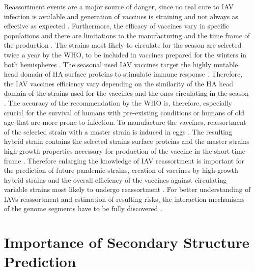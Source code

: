 Reassortment events are a major source of danger, since no real cure to \gls{IAV} infection is available and generation of vaccines is straining and not always as effective as expected \autocite{wahlgren_influenza_2011, wong_traditional_2013}. Furthermore, the efficacy of vaccines vary in specific populations and there are limitations to the manufacturing and the time frame of the production \autocite{wong_traditional_2013}. The strains most likely to circulate for the season are selected twice a year by the \gls{WHO}, to be included in vaccines prepared for the winters in both hemispheres \autocite{barr_epidemiological_2010}. The seasonal used \gls{IAV} vaccines target the highly mutable head domain of \gls{HA} surface proteins to stimulate immune response \autocite{wong_traditional_2013, wei_next-generation_2020}. Therefore, the \gls{IAV} vaccines efficiency vary depending on the similarity of the \gls{HA} head domain of the strains used for the vaccines and the ones circulating in the season \autocite{wei_next-generation_2020}. The accuracy of the recommendation by the \gls{WHO} is, therefore, especially crucial for the survival of humans with pre-existing conditions or humans of old age that are more prone to infection. To manufacture the vaccines, reassortment of the selected strain with a master strain is induced in eggs \autocite{wong_traditional_2013}. The resulting hybrid strain contains the selected strains surface proteins and the master strains high-growth properties necessary for production of the vaccine in the short time frame \autocite{wong_traditional_2013}. Therefore enlarging the knowledge of \gls{IAV} reassortment is important for the prediction of future pandemic strains, creation of vaccines by high-growth hybrid strains and the overall efficiency of the vaccines against circulating variable strains most likely to undergo reassortment \autocite{wong_traditional_2013, dadonaite_structure_2019}. For better understanding of \glspl{IAV} reassortment and estimation of resulting risks, the interaction mechanisms of the genome segments have to be fully discovered \autocite{dadonaite_structure_2019}. 

\section{Importance of Secondary Structure Prediction}

